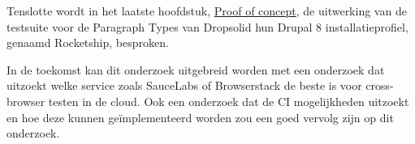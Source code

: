 Tenslotte wordt in het laatste hoofdstuk, \hyperref[ch:proofofconcept]{Proof of concept}, de uitwerking van de \gls{testsuite} voor de \gls{Paragraph Types} van Dropsolid hun Drupal 8 installatieprofiel, genaamd Rocketship, besproken.

In de toekomst kan dit onderzoek uitgebreid worden met een onderzoek dat uitzoekt welke service zoals SauceLabs of Browserstack de beste is voor cross-browser testen in de cloud. Ook een onderzoek dat de \gls{CI} mogelijkheden uitzoekt en hoe deze kunnen geïmplementeerd worden zou een goed vervolg zijn op dit onderzoek.
